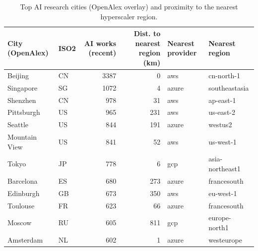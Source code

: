 \begin{table}[ht]
\centering
\begin{tabular}{llrrll}
\toprule
City (OpenAlex) & ISO2 & AI works (recent) & Dist. to nearest region (km) & Nearest provider & Nearest region \\
\midrule
Beijing & CN & 3387 & 0 & aws & cn-north-1 \\
Singapore & SG & 1072 & 4 & azure & southeastasia \\
Shenzhen & CN & 978 & 31 & aws & ap-east-1 \\
Pittsburgh & US & 965 & 231 & aws & us-east-2 \\
Seattle & US & 844 & 191 & azure & westus2 \\
Mountain View & US & 841 & 52 & aws & us-west-1 \\
Tokyo & JP & 778 & 6 & gcp & asia-northeast1 \\
Barcelona & ES & 680 & 273 & azure & francesouth \\
Edinburgh & GB & 673 & 350 & aws & eu-west-1 \\
Toulouse & FR & 623 & 66 & azure & francesouth \\
Moscow & RU & 605 & 811 & gcp & europe-north1 \\
Amsterdam & NL & 602 & 1 & azure & westeurope \\
\bottomrule
\end{tabular}
\caption{Top AI research cities (OpenAlex overlay) and proximity to the nearest hyperscaler region.}
\label{tab:top_ai_cities}
\end{table}
